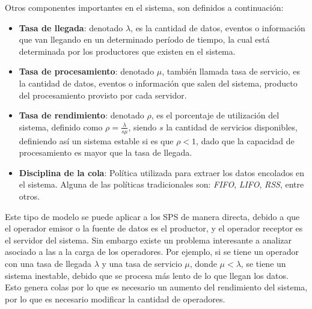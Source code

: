Otros componentes importantes en el sistema, son definidos a continuaci\'on:
\begin{itemize}
	\item \textbf{Tasa de llegada}: denotado $\lambda$, es la cantidad de datos, eventos o informaci\'on que van llegando en un determinado per\'iodo de tiempo, la cual est\'a determinada por los productores que existen en el sistema.
	\item \textbf{Tasa de procesamiento}: denotado $\mu$, tambi\'en llamada tasa de servicio, es la cantidad de datos, eventos o informaci\'on que salen del sistema, producto del procesamiento provisto por cada servidor.
	\item \textbf{Tasa de rendimiento}: denotado $\rho$, es el porcentaje de utilizaci\'on del sistema, definido como $\rho = \frac{\lambda}{s\mu}$, siendo $s$ la cantidad de servicios disponibles, definiendo as\'i un sistema estable si es que $\rho < 1$, dado que la capacidad de procesamiento es mayor que la tasa de llegada.
	\item \textbf{Disciplina de la cola}: Pol\'itica utilizada para extraer los datos encolados en el sistema. Alguna de las pol\'iticas tradicionales son: \textit{FIFO}, \textit{LIFO}, \textit{RSS}, entre otros.
\end{itemize}

Este tipo de modelo se puede aplicar a los SPS de manera directa, debido a que el operador emisor o la fuente de datos es el productor, y el operador receptor es el servidor del sistema. Sin embargo existe un problema interesante a analizar asociado a las a la carga de los operadores. Por ejemplo, si se tiene un operador con una tasa de llegada $\lambda$ y una tasa de servicio $\mu$, donde $\mu < \lambda$, se tiene un sistema inestable, debido que se procesa m\'as lento de lo que llegan los datos. Esto genera colas por lo que es necesario un aumento del rendimiento del sistema, por lo que es necesario modificar la cantidad de operadores.